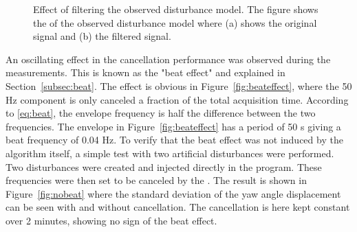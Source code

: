 \begin{figure}[h!]
  \centering %
  \qquad
  \caption{\label{fig:bandpass_imp} Effect of filtering the observed disturbance model. The figure shows the \abbrFFT of the observed disturbance model where (a) shows the original signal and (b) the filtered signal.}
\end{figure}
\FloatBarrier
An oscillating effect in the cancellation performance was observed during the measurements. This is known as the "beat effect" and explained in Section~\ref{subsec:beat}. The effect is obvious in Figure~\ref{fig:beateffect}, where the 50 Hz component is only canceled a fraction of the total acquisition time. According to \eqref{eq:beat}, the envelope frequency is half the difference between the two frequencies. The envelope in Figure~\ref{fig:beateffect} has a period of 50 s giving a beat frequency of 0.04 Hz. To verify that the beat effect was not induced by the algorithm itself, a simple test with two artificial disturbances were performed. Two disturbances were created and injected directly in the program. These frequencies were then set to be canceled by the \abbrRFDC. The result is shown in Figure~\ref{fig:nobeat} where the standard deviation of the yaw angle displacement can be seen with and without cancellation. The cancellation is here kept constant over 2 minutes, showing no sign of the beat effect.

